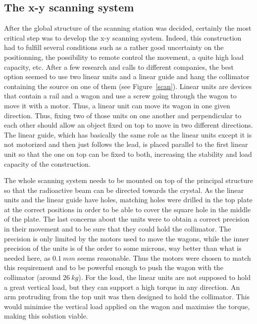 \documentclass[11pt,a4paper]{article}
\begin{document}
\subsection{The x-y scanning system} \label{x-y}

After the global structure of the scanning station was decided, certainly the most critical step was to develop the x-y scanning system. Indeed, this construction had to fulfill several conditions such as a rather good uncertainty on the positionning, the possibility to remote control the movement, a quite high load capacity, etc. After a few research and calls to different companies, the best option seemed to use two linear units and a linear guide and hang the collimator containing the source on one of them (see Figure~\ref{scan}). Linear units are devices that contain a rail and a wagon and use a screw going through the wagon to move it with a motor. Thus, a linear unit can move its wagon in one given direction. Thus, fixing two of those units on one another and perpendicular to each other should allow an object fixed on top to move in two different directions. The linear guide, which has basically the same role as the linear units except it is not motorized and then just follows the lead, is placed parallel to the first linear unit so that the one on top can be fixed to both, increasing the stability and load capacity of the construction.

The whole scanning system needs to be mounted on top of the principal structure so that the radioactive beam can be directed towards the crystal. As the linear units and the linear guide have holes, matching holes were drilled in the top plate at the correct positions in order to be able to cover the square hole in the middle of the plate. The last concerns about the units were to obtain a correct precision in their movement and to be sure that they could hold the collimator. The precision is only limited by the motors used to move the wagons, while the inner precision of the units is of the order to some microns, way better than what is needed here, as $0.1~mm$ seems reasonable. Thus the motors were chosen to match this requirement and to be powerful enough to push the wagon with the collimator (around $26~kg$). For the load, the linear units are not supposed to hold a great vertical load, but they can support a high torque in any direction. An arm protruding from the top unit was then designed to hold the collimator. This would minimise the vertical load applied on the wagon and maximise the torque, making this solution viable.
\end{document}
